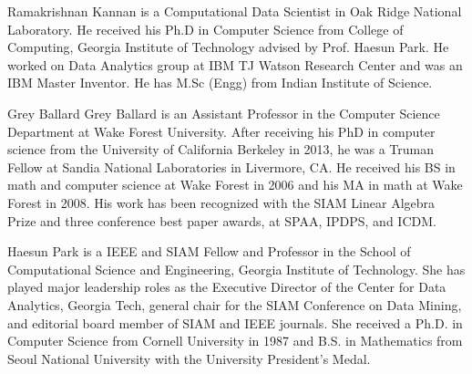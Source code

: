\vspace{-0.5in}
\begin{IEEEbiography}{Ramakrishnan Kannan}
is a Computational Data Scientist in 
Oak Ridge National Laboratory.
He received his Ph.D in Computer Science from College of Computing, 
Georgia Institute of Technology advised by Prof. Haesun Park. 
He worked on Data Analytics group at IBM TJ Watson Research Center and 
was an IBM Master Inventor. He has M.Sc (Engg) from Indian Institute of Science.  
\end{IEEEbiography}

\vspace{-0.5in}
\begin{IEEEbiography}{Grey Ballard}
Grey Ballard is an Assistant Professor in the Computer Science Department at Wake Forest University. After receiving his PhD in computer science from the University of California Berkeley in 2013, he was a Truman Fellow at Sandia National Laboratories in Livermore, CA. 
He received his BS in math and computer science at Wake Forest in 2006 and his MA in math at Wake Forest in 2008.
His work has been recognized with the SIAM Linear Algebra Prize and three conference best paper awards, at SPAA, IPDPS, and ICDM.
\end{IEEEbiography}
\vspace{-0.5in}

\begin{IEEEbiography}{Haesun Park}
is a IEEE and SIAM Fellow and Professor in the 
School of Computational Science and Engineering, 
Georgia Institute of Technology. 
She has played major leadership  roles as the Executive Director
of the Center for Data Analytics, Georgia Tech, general chair for the SIAM 
Conference on Data Mining, and editorial board member of SIAM
and IEEE journals. She received a  Ph.D. in Computer Science 
from Cornell University in 1987 and B.S. in Mathematics from Seoul National 
University with the University President's Medal.
\end{IEEEbiography}
